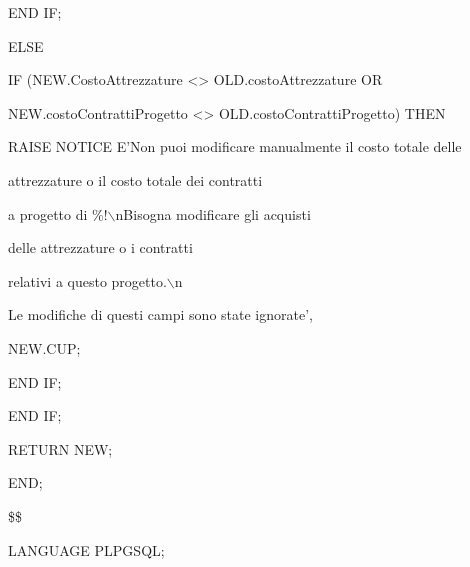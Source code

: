 \begin{flushleft}
\begin{description}
\begin{description}
\begin{description}
                        \item END IF;
                    \end{description}
                    \item ELSE
                    \begin{description}
                        \item IF (NEW.CostoAttrezzature <> OLD.costoAttrezzature OR
                        \item \hspace{0.75cm}NEW.costoContrattiProgetto <> OLD.costoContrattiProgetto) THEN
                        \vspace{0.2cm}
                        \begin{description}
                            \item RAISE NOTICE E'Non puoi modificare manualmente il costo totale delle
                            \item \hspace{2.6cm}attrezzature o il costo totale dei contratti
                            \item \hspace{2.6cm}a progetto di \%!$\backslash$nBisogna modificare gli acquisti
                            \item \hspace{2.6cm}delle attrezzature o i contratti 
                            \item \hspace{2.6cm}relativi a questo progetto.$\backslash$n
                            \item \hspace{2.6cm}Le modifiche di questi campi sono state ignorate',
                            \item \hspace{2.6cm}NEW.CUP;
                        \end{description}
                        \item END IF;
                    \end{description}
                    \item END IF;
                    \item
                    \item RETURN NEW;
                \end{description}
                \item END;
                \item \$\$
                \item LANGUAGE PLPGSQL;
            \end{description}
        \end{flushleft}
    \normalfont

